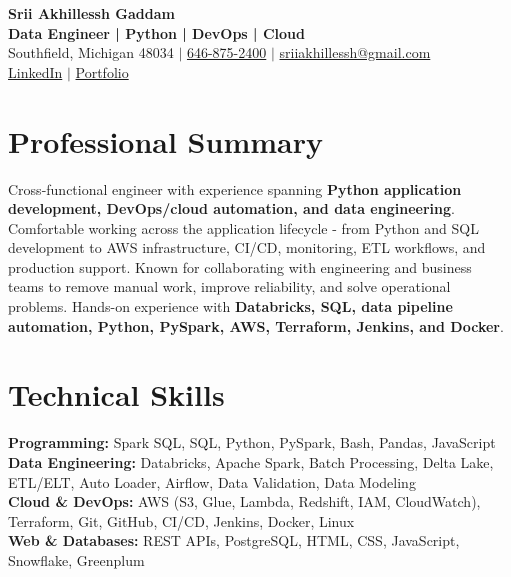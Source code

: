 \documentclass[letterpaper,10pt]{article}
\begin{document}
\fontsize{9.35pt}{10.45pt}\selectfont

\begin{center}
    {\LARGE \textbf{Srii Akhillessh Gaddam}} \\[-1pt]
    \textbf{Data Engineer | Python | DevOps | Cloud} \\[2pt]
    Southfield, Michigan 48034 $|$
    \href{tel:6468752400}{646-875-2400} $|$
    \href{mailto:sriiakhillessh@gmail.com}{sriiakhillessh@gmail.com} \\[1pt]
    \href{https://www.linkedin.com/in/srii-akhiilessh-gaddam-b48668191/}{LinkedIn} $|$
    \href{https://sriiakhillesshg.github.io/portfolio/}{Portfolio}
\end{center}
\vspace{-8pt}

\section{Professional Summary}
\small{Cross-functional engineer with experience spanning \textbf{Python application development, DevOps/cloud automation, and data engineering}. Comfortable working across the application lifecycle - from Python and SQL development to AWS infrastructure, CI/CD, monitoring, ETL workflows, and production support. Known for collaborating with engineering and business teams to remove manual work, improve reliability, and solve operational problems. Hands-on experience with \textbf{Databricks, SQL, data pipeline automation, Python, PySpark, AWS, Terraform, Jenkins, and Docker}.}

\section{Technical Skills}
\small{
\textbf{Programming:} Spark SQL, SQL, Python, PySpark, Bash, Pandas, JavaScript \\
\textbf{Data Engineering:} Databricks, Apache Spark, Batch Processing, Delta Lake, ETL/ELT, Auto Loader, Airflow, Data Validation, Data Modeling \\
\textbf{Cloud \& DevOps:} AWS (S3, Glue, Lambda, Redshift, IAM, CloudWatch), Terraform, Git, GitHub, CI/CD, Jenkins, Docker, Linux \\
\textbf{Web \& Databases:} REST APIs, PostgreSQL, HTML, CSS, JavaScript, Snowflake, Greenplum
}
\end{document}
